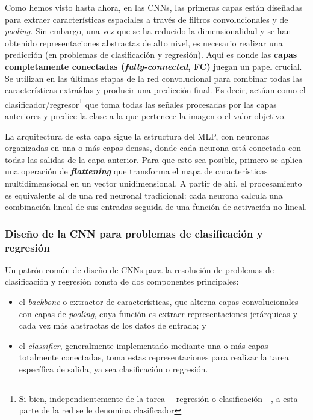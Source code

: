 Como hemos visto hasta ahora, en las CNNs, las primeras capas están diseñadas para extraer características
espaciales a través de filtros convolucionales y de \textit{pooling}. Sin embargo, una vez que se ha reducido 
la dimensionalidad y se han obtenido representaciones abstractas de alto nivel, es necesario realizar una 
predicción (en problemas de clasificación y regresión). 
Aquí es donde las \textbf{capas completamente conectadas (\textit{fully-connected}, FC)} juegan un papel 
crucial. Se utilizan en las últimas etapas de la red convolucional para combinar todas las características 
extraídas y producir una predicción final. Es decir, actúan como el clasificador/regresor\footnote{
    Si bien, independientemente de la tarea ---regresión o clasificación---, a esta parte de la red se le 
    denomina clasificador
} que toma todas las señales 
procesadas por las capas anteriores y predice la clase a la que pertenece la imagen o el valor objetivo. 

La arquitectura de esta capa sigue la estructura del MLP, con neuronas organizadas en una o más capas densas, 
donde cada neurona está conectada con todas las salidas de la capa anterior. Para que esto sea posible, 
primero se aplica una operación de \textbf{\textit{flattening}} que transforma el mapa de características 
multidimensional en un vector unidimensional. A partir de ahí, el procesamiento es equivalente al de una red 
neuronal tradicional: cada neurona calcula una combinación lineal de sus entradas seguida de una función de 
activación no lineal.


\subsubsection{Diseño de la CNN para problemas de clasificación y regresión}

Un patrón común de diseño de CNNs para la resolución de problemas de clasificación y regresión consta de dos
componentes principales:

\begin{itemize}

    \item el \textit{backbone} o extractor de características, que alterna capas convolucionales con capas de
    \textit{pooling}, cuya función es extraer representaciones jerárquicas y cada vez más abstractas de los 
    datos de entrada; y

    \item el \textit{classifier}, generalmente implementado mediante una o más capas totalmente conectadas, 
    toma estas representaciones para realizar la tarea específica de salida, ya sea clasificación o regresión.

\end{itemize}


